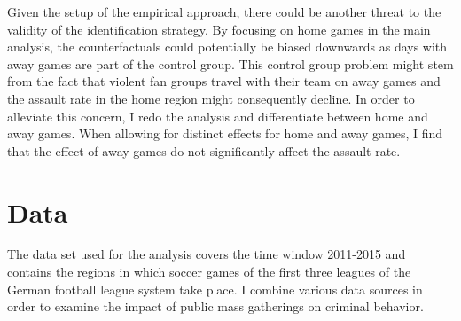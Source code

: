 \documentclass[11pt, a4paper]{article} %
\begin{document}
Given the setup of the empirical approach, there could be another threat to the validity of the identification strategy. By focusing on home games in the main analysis, the counterfactuals could potentially be biased downwards as days with away games are part of the control group. This control group problem might stem from the fact that violent fan groups travel with their team on away games and the assault rate in the home region might consequently decline. In order to alleviate this concern, I redo the analysis and differentiate between home and away games. When allowing for distinct effects for home and away games, I find that the effect of away games do not significantly affect the assault rate. 








\bigskip
\section{Data}\label{sec_soc_ext:data} 
The data set used for the analysis covers the time window 2011-2015 and contains the regions in which soccer games of the first three leagues of the German football league system take place. I combine various data sources in order to examine the impact of public mass gatherings on criminal behavior.
\end{document}
